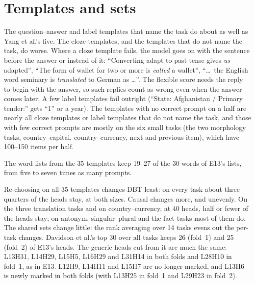 \documentclass[10pt,a4paper]{article}
\begin{document}
\section{Templates and sets}

\begin{table}[H]\centering\scriptsize
\resizebox{\linewidth}{!}{}
\caption{E0 on the 35 templates: flexible accuracy without a patch (zero-shot), mean of each group's five templates, on the first 500 items of each half (the E0 items of the new templates). $<30$: templates with fewer than 30 correct prompts on at least one half, so a mean from few prompts on that fold; 0: templates with none on at least one half, which give no mean there.}
\label{tab:e0}
\end{table}

The question--answer and label templates that name the task do about as well as Yang et al.'s five. The cloze templates, and the templates that do not name the task, do worse. Where a cloze template fails, the model goes on with the sentence before the answer or instead of it: ``Converting adapt to past tense gives \emph{us} adapted'', ``The form of wallet for two or more is \emph{called} a wallet'', ``\ldots\ the English word seminary is \emph{translated} to German as \ldots''. The flexible score needs the reply to begin with the answer, so such replies count as wrong even when the answer comes later. A few label templates fail outright (``State: Afghanistan / Primary tender:'' gets ``1'' or a year). The templates with no correct prompt on a half are nearly all cloze templates or label templates that do not name the task, and those with few correct prompts are mostly on the six small tasks (the two morphology tasks, country--capital, country--currency, next and previous item), which have 100--150 items per half.

The word lists from the 35 templates keep 19--27 of the 30 words of E13's lists, from five to seven times as many prompts.

\begin{table}[H]\centering\small

\caption{Heads of each set chosen on all 35 templates that are also in the same set chosen on Yang's 5 (E13), mean over tasks and folds.}
\label{tab:overlap}
\end{table}

Re-choosing on all 35 templates changes DBT least: on every task about three quarters of the heads stay, at both sizes. Causal changes more, and unevenly. On the three translation tasks and on country--currency, at 40 heads, half or fewer of the heads stay; on antonym, singular--plural and the fact tasks most of them do. The shared sets change little: the rank averaging over 14 tasks evens out the per-task changes. Davidson et al.'s top 30 over all tasks keeps 26 (fold~1) and 25 (fold~2) of E13's heads. The generic heads cut from it are much the same: L13H31, L14H29, L15H5, L16H29 and L31H14 in both folds and L28H10 in fold~1, as in E13. L12H9, L14H11 and L15H7 are no longer marked, and L13H6 is newly marked in both folds (with L13H25 in fold~1 and L29H23 in fold~2).

\end{document}
